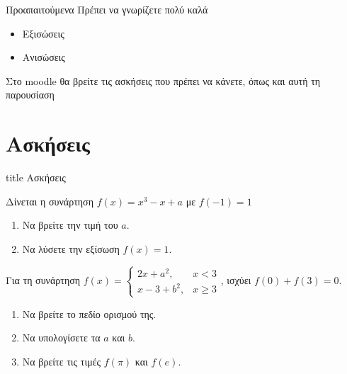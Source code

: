 \documentclass{presentation}
\begin{document}
\begin{frame}{Προαπαιτούμενα}
      Πρέπει να γνωρίζετε πολύ καλά
      \begin{itemize}
            \item Εξισώσεις
            \item Ανισώσεις
      \end{itemize}
\end{frame}

\begin{frame}[noframenumbering]
      Στο moodle θα βρείτε τις ασκήσεις που πρέπει να κάνετε, όπως και αυτή τη παρουσίαση
\end{frame}

\section{Ασκήσεις}

\begin{frame}[noframenumbering]
      \vfill
      \centering
      \begin{beamercolorbox}[sep=8pt,center,shadow=true,rounded=true]{title}
            Ασκήσεις
      \end{beamercolorbox}
      \vfill
\end{frame}

\begin{askisi}
      Δίνεται η συνάρτηση $f(x)=x^3-x+a$ με $f(-1)=1$
      \begin{enumerate}
            \item<1-> Να βρείτε την τιμή του $a$.
            \item<2-> Να λύσετε την εξίσωση $f(x)=1$.
      \end{enumerate}
\end{askisi}

\begin{askisi}
      Για τη συνάρτηση $f(x)=\begin{cases}
                  2x+a^2,  & x<3   \\
                  x-3+b^2, & x\ge3
            \end{cases}$, ισχύει $f(0)+f(3)=0$.
      \begin{enumerate}
            \item<1-> Να βρείτε το πεδίο ορισμού της.
            \item<2-> Να υπολογίσετε τα $a$ και $b$.
            \item<3-> Να βρείτε τις τιμές $f(\pi)$ και $f(e)$.
      \end{enumerate}
\end{askisi}
\end{document}
